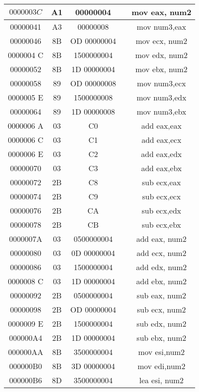 \documentclass[10pt]{article}
\begin{document}
\begin{center}
\begin{tabular}{|c|c|c|c|c|}
\hline
$0000003 C$ & A1 & 00000004 &  & mov eax, num2 \\
\hline
00000041 & A3 & 00000008 &  & mov num3,eax \\
\hline
00000046 & 8B & OD 00000004 &  & mov ecx, num2 \\
\hline
0000004 C & 8B & 1500000004 &  & mov edx, num2 \\
\hline
00000052 & 8B & 1D 00000004 &  & mov ebx, num2 \\
\hline
00000058 & 89 & OD 00000008 &  & mov num3,ecx \\
\hline
0000005 E & 89 & 1500000008 &  & mov num3,edx \\
\hline
00000064 & 89 & 1D 00000008 &  & mov num3,ebx \\
\hline
0000006 A & 03 & C0 &  & add eax,eax \\
\hline
0000006 C & 03 & C1 &  & add eax,ecx \\
\hline
0000006 E & 03 & C2 &  & add eax,edx \\
\hline
00000070 & 03 & C3 &  & add eax,ebx \\
\hline
00000072 & 2B & C8 &  & sub ecx,eax \\
\hline
00000074 & 2B & C9 &  & sub ecx,ecx \\
\hline
00000076 & 2B & CA &  & sub ecx,edx \\
\hline
00000078 & 2B & CB &  & sub ecx,ebx \\
\hline
0000007A & 03 & 0500000004 &  & add eax, num2 \\
\hline
00000080 & 03 & 0D 00000004 &  & add ecx, num2 \\
\hline
00000086 & 03 & 1500000004 &  & add edx, num2 \\
\hline
0000008 C & 03 & 1D 00000004 &  & add ebx, num2 \\
\hline
00000092 & 2B & 0500000004 &  & sub eax, num2 \\
\hline
00000098 & 2B & OD 00000004 &  & sub ecx, num2 \\
\hline
0000009 E & 2B & 1500000004 &  & sub edx, num2 \\
\hline
000000A4 & 2B & 1D 00000004 &  & sub ebx, num2 \\
\hline
000000AA & 8B & 3500000004 &  & mov esi,num2 \\
\hline
000000B0 & 8B & 3D 00000004 &  & mov edi,num2 \\
\hline
000000B6 & 8D & 3500000004 &  & lea esi, num2 \\

\end{tabular}
\end{center}
\end{document}
